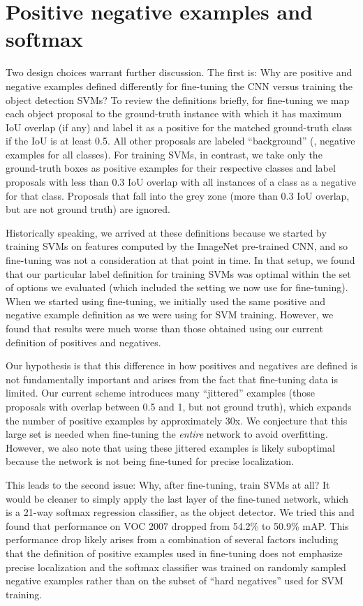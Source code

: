 \section{Positive \vs negative examples and softmax}
Two design choices warrant further discussion.
The first is: Why are positive and negative examples defined differently for fine-tuning the CNN versus training the object detection SVMs?
To review the definitions briefly, for fine-tuning we map each object proposal to the ground-truth instance with which it has maximum IoU overlap (if any) and label it as a positive for the matched ground-truth class if the IoU is at least 0.5.
All other proposals are labeled ``background'' (\ie, negative examples for all classes).
For training SVMs, in contrast, we take only the ground-truth boxes as positive examples for their respective classes and label proposals with less than 0.3 IoU overlap with all instances of a class as a negative for that class.
Proposals that fall into the grey zone (more than 0.3 IoU overlap, but are not ground truth) are ignored.

Historically speaking, we arrived at these definitions because we started by training SVMs on features computed by the ImageNet pre-trained CNN, and so fine-tuning was not a consideration at that point in time.
In that setup, we found that our particular label definition for training SVMs was optimal within the set of options we evaluated (which included the setting we now use for fine-tuning).
When we started using fine-tuning, we initially used the same positive and negative example definition as we were using for SVM training.
However, we found that results were much worse than those obtained using our current definition of positives and negatives.

Our hypothesis is that this difference in how positives and negatives are defined is not fundamentally important and arises from the fact that fine-tuning data is limited.
Our current scheme introduces many ``jittered'' examples (those proposals with overlap between 0.5 and 1, but not ground truth), which expands the number of positive examples by approximately 30x.
We conjecture that this large set is needed when fine-tuning the \emph{entire} network to avoid overfitting.
However, we also note that using these jittered examples is likely suboptimal because the network is not being fine-tuned for precise localization.

This leads to the second issue: Why, after fine-tuning, train SVMs at all?
It would be cleaner to simply apply the last layer of the fine-tuned network, which is a 21-way softmax regression classifier, as the object detector.
We tried this and found that performance on VOC 2007 dropped from 54.2\% to 50.9\% mAP.
This performance drop likely arises from a combination of several factors including that the definition of positive examples used in fine-tuning does not emphasize precise localization and the softmax classifier was trained on randomly sampled negative examples rather than on the subset of ``hard negatives'' used for SVM training.

